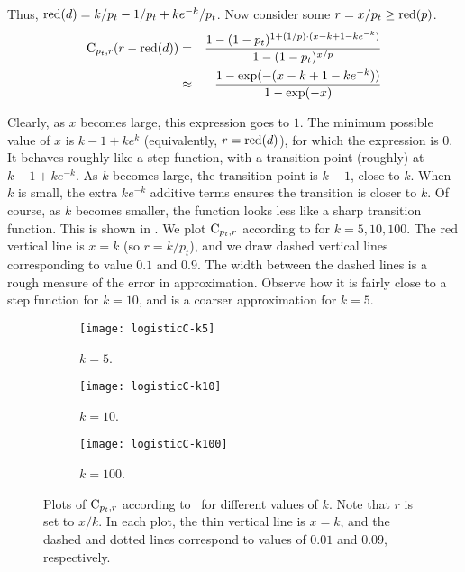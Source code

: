 \documentclass[11pt]{article}
\theoremstyle{definition}
\newcommand{\cdf}{\hbox{C}}
\newcommand{\rd}{{\hbox{red}}}
\newcommand{\mult}{k}
\begin{document}
Thus, $\rd(d) = \mult/p_t - 1/p_t + \mult e^{-\mult}/p_t$. Now consider some $r = x/p_t \geq \rd(p)$.
\begin{eqnarray}
    \cdf_{p_t,r}(r-\rd(d)) & = & \frac{1-(1-p_t)^{1+(1/p)\cdot(x- \mult + 1- \mult e^{-\mult})}}{1-(1-p_t)^{x/p}} \nonumber\\
    & \approx & \frac{1-\exp(-(x-\mult+1-\mult e^{-\mult}))}{1-\exp(-x)} \label{eqn:cdf}
\end{eqnarray}



Clearly, as $x$ becomes large, this expression goes to $1$. The minimum possible
value of $x$ is $\mult-1+\mult e^{\mult} $ (equivalently, $r = \rd(d)$), for which
the expression is $0$. It behaves roughly like a step function, with a transition point (roughly)
at $\mult-1+\mult e^{-\mult}$. As $\mult$ becomes large, the transition point is $\mult-1$, close
to $\mult$.
When $\mult$ is small, the extra $\mult e^{-\mult}$ additive terms
ensures the transition is closer to $\mult$. Of course, as $\mult$ becomes smaller, the function looks less
like a sharp transition function.
This is shown in . We plot $\cdf_{p_t,r}$ according to  for $k=5, 10, 100$. The red vertical
line is $x=k$ (so $r = k/p_t$), and we draw dashed vertical lines corresponding to value $0.1$ and $0.9$.
The width between the dashed lines is a rough measure of the error in approximation.
Observe how it is fairly close to a step function for $k=10$, and is a coarser approximation for $k=5$.


\begin{figure*}[t]
    \centering
    \begin{subfigure}[b]{0.3\textwidth}
        \centering \texttt{[image: logisticC-k5]}
        \caption{$k=5$.}
        \label{fig:logisticC-k5}
    \end{subfigure}
    \hfill
    \begin{subfigure}[b]{0.3\textwidth}
        \centering \texttt{[image: logisticC-k10]}
        \caption{$k=10$.}
        \label{fig:logisticC-k10}
    \end{subfigure}
    \hfill
    \begin{subfigure}[b]{0.3\textwidth}
        \centering \texttt{[image: logisticC-k100]}
        \caption{$k=100$.}
        \label{fig:logisticC-k100}
    \end{subfigure}
    \caption{Plots of $\cdf_{p_t,r}$ according to~ for different values of $k$. Note that $r$ is set to $x/k$. In each
    plot, the thin vertical line is $x = k$, and the dashed and dotted lines
correspond to values of $0.01$ and $0.09$, respectively.}
    \label{fig:step}
\end{figure*}
\end{document}
